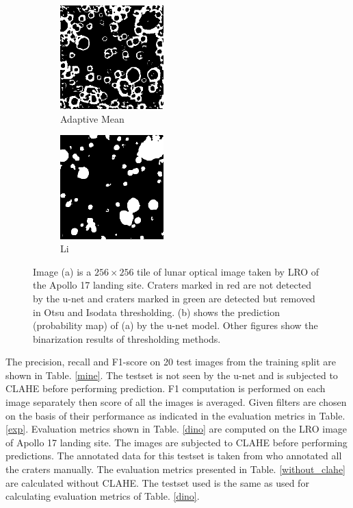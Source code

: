 \documentclass[11pt]{article}
\begin{document}
\begin{figure}[H]
\begin{subfigure}{5cm}
		\centering
		\includegraphics[width=4cm]{files/results/adaptiveMean_mean.png}
		\caption{Adaptive Mean}\hfill
	\end{subfigure}
	\begin{subfigure}[b]{1.0\textwidth}
		\centering
		\includegraphics[width=4cm]{files/results/li.png}
		\caption{Li}\hfill
	\end{subfigure}
\caption{Image (a) is a $256 \times 256$ tile of lunar optical image taken by LRO of the Apollo 17 landing site. Craters marked in red are not detected by the u-net and craters marked in green are detected but removed in Otsu and Isodata thresholding.  (b) shows the prediction (probability map) of (a) by the u-net model. Other figures show the binarization results of thresholding methods.}
\label{thresholding}	
\end{figure}

The precision, recall and F1-score on 20 test images from the training split are shown in Table. \ref{mine}. The testset is not seen by the u-net and is subjected to CLAHE before performing prediction. F1 computation is performed on each image separately then score of all the images is averaged. Given filters are chosen on the basis of their performance as indicated in the evaluation metrics in Table. \ref{exp}. Evaluation metrics shown in Table. \ref{dino} are computed on the LRO image of Apollo 17 landing site. The images are subjected to CLAHE before performing predictions. The annotated data for this testset is taken from \cite{dino2020} who annotated all the craters manually. The evaluation metrics presented in Table. \ref{without_clahe} are calculated without CLAHE. The testset used is the same as used for calculating evaluation metrics of Table. \ref{dino}.
\end{document}
